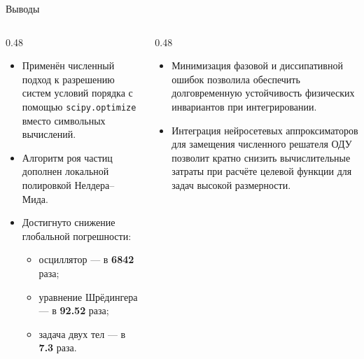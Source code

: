 \begin{frame}{Выводы}
	\small
	\begin{columns}[T] %
		
		\begin{column}{0.48\textwidth}
			\begin{itemize}
				\item Применён численный подход к разрешению систем условий порядка с помощью \texttt{scipy.optimize} вместо символьных вычислений.
				
				\item Алгоритм роя частиц дополнен локальной полировкой Нелдера--Мида.
				
				\item Достигнуто снижение глобальной погрешности:
				\begin{itemize}
					\item осциллятор --- в \textbf{6842} раза;
					\item уравнение Шрёдингера --- в \textbf{92.52} раза;
					\item задача двух тел --- в \textbf{7.3} раза.
				\end{itemize}
			\end{itemize}
		\end{column}
		

		\begin{column}{0.48\textwidth}
			\begin{itemize}
				\item Минимизация фазовой и диссипативной ошибок позволила обеспечить долговременную устойчивость физических инвариантов при интегрировании.

				\item Интеграция нейросетевых аппроксиматоров для замещения численного решателя ОДУ позволит кратно снизить вычислительные затраты при расчёте целевой функции для задач высокой размерности.
			\end{itemize}
		\end{column}
		
	\end{columns}
\end{frame}